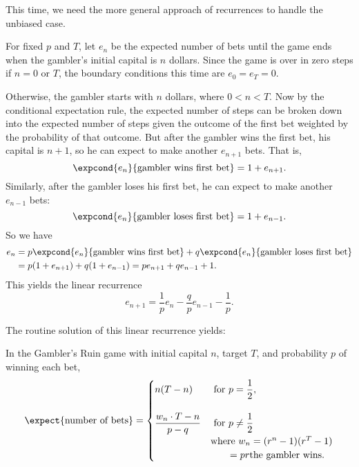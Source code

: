 This time, we need the more general approach of recurrences to handle the
unbiased case.  
\fi

For fixed $p$ and $T$, let $e_n$ be the expected number of bets until
the game ends when the gambler's initial capital is $n$ dollars.
Since the game is over in zero steps if $n=0$ or $T$, the boundary
conditions this time are $e_0=e_T=0$.

Otherwise, the gambler starts with $n$ dollars, where $0 < n < T$.
Now by the conditional expectation rule, the expected number of steps
can be broken down into the expected number of steps given the outcome
of the first bet weighted by the probability of that outcome.  But
after the gambler wins the first bet, his capital is $n+1$, so he can
expect to make another $e_{n+1}$ bets.
That is,
\[
\expcond{e_n}{\text{gambler wins first bet}} = 1 + e_{n+1}.
\]
Similarly, after the gambler loses his first bet, he can expect to
make another $e_{n-1}$ bets:
\[
\expcond{e_n}{\text{gambler loses first bet}} = 1 + e_{n-1}.
\]
So we have
\begin{align*}
e_n & = p\expcond{e_n}{\text{gambler wins first bet}} +
      q\expcond{e_n}{\text{gambler loses first bet}}\\
    & = p(1 + e_{n+1}) +  q(1 + e_{n-1}) =  pe_{n+1} + qe_{n-1} + 1.
\end{align*}
This yields the linear recurrence
\begin{equation}\label{expected-bets-recurrence}
e_{n+1} = \frac{1}{p} e_n - \frac{q}{p} e_{n-1} - \frac{1}{p}.
\end{equation}
\iffalse
For $p = q = 1/2$, this simplifies to
\begin{equation}\label{expected-fair-bets-recurrence}
e_{n+1} = 2e_n - e_{n-1} - 2.
\end{equation}

\fi

The routine solution of this linear recurrence yields:
\begin{theorem}\label{ExQthm}
In the Gambler's Ruin game with initial capital $n$, target
$T$, and probability $p$ of winning each bet,
\begin{equation}\label{expectedbets}
\expect{\text{number of bets}} =
 \begin{cases}
 n(T-n) & \text{ for } p = \dfrac{1}{2},\\
          \\ 
\dfrac{w_n  \cdot T - n}{p-q} %
       & \text{ for } p \neq \dfrac{1}{2}\\
       & \text{where } w_n = (r^n - 1)(r^T - 1)\\
       & \qquad = pr{\text{the gambler wins}}.
\end{cases}
\end{equation}
\end{theorem}

